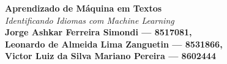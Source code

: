 \documentclass[a0,portrait]{a0poster}
\begin{document}
\frenchspacing



\begin{minipage}[b]{0.75\linewidth}
\veryHuge \color{NavyBlue} \textbf{Aprendizado de Máquina em Textos} \color{Black}\\ %
\Huge\textit{Identificando Idiomas com \emph{Machine Learning}}\\[2cm]
\huge \textbf{Jorge Ashkar Ferreira Simondi --- 8517081,\\
              Leonardo de Almeida Lima Zanguetin --- 8531866,\\
              Victor Luiz da Silva Mariano Pereira --- 8602444}\\[1cm]
\end{minipage}
%
\end{document}
